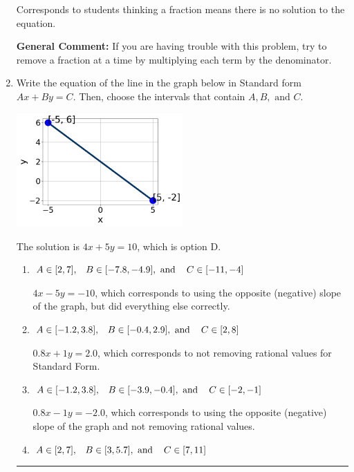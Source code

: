\documentclass{extbook}[14pt]
\newcommand{\litem}[1]{\item #1

\rule{\textwidth}{0.4pt}}
\begin{document}
\begin{enumerate}
{\begin{enumerate}[label=\Alph*.]
Corresponds to students thinking a fraction means there is no solution to the equation.
\end{enumerate}

\textbf{General Comment:} If you are having trouble with this problem, try to remove a fraction at a time by multiplying each term by the denominator.
}
\litem{
Write the equation of the line in the graph below in Standard form $Ax+By=C$. Then, choose the intervals that contain $A, B, \text{ and } C$.

\begin{center}
    \includegraphics[width=0.5\textwidth]{../Figures/linearGraphToStandardCopyA.png}
\end{center}


The solution is \( 4x + 5y = 10 \), which is option D.\begin{enumerate}[label=\Alph*.]
\item \( A \in [2, 7], \hspace{3mm} B \in [-7.8, -4.9], \text{ and } \hspace{3mm} C \in [-11, -4] \)

 $4x - 5y = -10$, which corresponds to using the opposite (negative) slope of the graph, but did everything else correctly.
\item \( A \in [-1.2, 3.8], \hspace{3mm} B \in [-0.4, 2.9], \text{ and } \hspace{3mm} C \in [2, 8] \)

 $0.8x + 1y = 2.0$, which corresponds to not removing rational values for Standard Form.
\item \( A \in [-1.2, 3.8], \hspace{3mm} B \in [-3.9, -0.4], \text{ and } \hspace{3mm} C \in [-2, -1] \)

 $0.8x - 1y = -2.0$, which corresponds to using the opposite (negative) slope of the graph and not removing rational values.
\item \( A \in [2, 7], \hspace{3mm} B \in [3, 5.7], \text{ and } \hspace{3mm} C \in [7, 11] \)


\end{enumerate}}
\end{enumerate}
\end{document}
